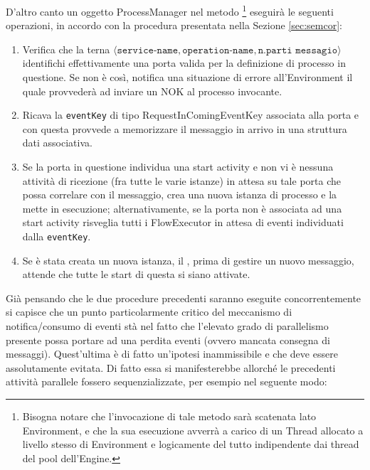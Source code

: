 D'altro canto un oggetto ProcessManager nel metodo
\footnote{Bisogna notare che l'invocazione di
tale metodo sarà scatenata lato Environment, e che la sua esecuzione avverrà a
carico di un Thread allocato a livello stesso di Environment e logicamente del
tutto indipendente dai thread del pool dell'Engine.} eseguirà le seguenti
operazioni, in accordo con la procedura presentata nella Sezione \ref{sec:semcor}:

\begin{enumerate}
  \item Verifica che la terna $\langle \texttt{service-name},
  \texttt{operation-name}, \texttt{n.parti messagio} \rangle$  identifichi
  effettivamente una porta valida per la definizione di processo in questione. 
  Se non \`e così, notifica una situazione di errore all'Environment il quale
  provvederà ad inviare un NOK al processo invocante.
 
 \item Ricava la \texttt{eventKey} di tipo RequestInComingEventKey associata
 alla porta e con questa provvede a memorizzare il messaggio in arrivo in 
 una struttura dati associativa.
 
 \item Se la porta in questione individua una start activity e non vi è nessuna attività di
 ricezione (fra tutte le varie istanze) in attesa su tale porta che possa
 correlare con il messaggio, crea una nuova istanza di processo e la mette in
 esecuzione; alternativamente, se la porta non \`e associata ad una start
 activity risveglia tutti i FlowExecutor in attesa di eventi individuati dalla \texttt{eventKey}.
 
 \item Se è stata creata un nuova istanza, il , prima di
 gestire un nuovo messaggio, attende che tutte le start 
 di questa si siano attivate. 
\end{enumerate}

Già pensando che le due procedure precedenti saranno eseguite concorrentemente
si capisce che un punto particolarmente critico del meccanismo di
notifica/consumo di eventi stà nel fatto che l'elevato grado di parallelismo
presente possa portare ad una perdita eventi (ovvero mancata consegna di
messaggi). Quest'ultima \`e di fatto un'ipotesi inammissibile e che deve
essere assolutamente evitata. Di fatto essa si manifesterebbe allorché le precedenti
attività parallele fossero sequenzializzate, per esempio nel seguente modo:

